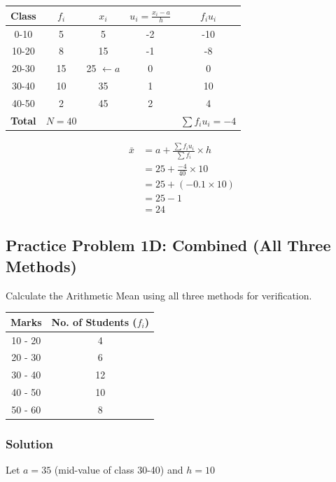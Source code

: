 \documentclass[12pt, a4paper]{article}
\begin{document}
\begin{center}
\begin{tabular}{|c|c|c|c|c|}
\hline
\textbf{Class} & $f_i$ & $x_i$ & $u_i = \frac{x_i - a}{h}$ & $f_i u_i$ \\ \hline
0-10 & 5 & 5 & -2 & -10 \\ \hline
10-20 & 8 & 15 & -1 & -8 \\ \hline
20-30 & 15 & 25 $\leftarrow a$ & 0 & 0 \\ \hline
30-40 & 10 & 35 & 1 & 10 \\ \hline
40-50 & 2 & 45 & 2 & 4 \\ \hline
\textbf{Total} & $N=40$ & & & $\sum f_i u_i = -4$ \\ \hline
\end{tabular}
\end{center}

\begin{align*}
\bar{x} &= a + \frac{\sum f_i u_i}{\sum f_i} \times h \\
        &= 25 + \frac{-4}{40} \times 10 \\
        &= 25 + (-0.1 \times 10) \\
        &= 25 - 1 \\
        &= 24
\end{align*}

\hrulefill

\subsection*{Practice Problem 1D: Combined (All Three Methods)}
Calculate the Arithmetic Mean using all three methods for verification.
\begin{center}
\begin{tabular}{|c|c|}
\hline
\textbf{Marks} & \textbf{No. of Students ($f_i$)} \\ \hline
10 - 20 & 4 \\ \hline
20 - 30 & 6 \\ \hline
30 - 40 & 12 \\ \hline
40 - 50 & 10 \\ \hline
50 - 60 & 8 \\ \hline
\end{tabular}
\end{center}

\subsubsection*{Solution}
Let $a = 35$ (mid-value of class 30-40) and $h = 10$
\end{document}

